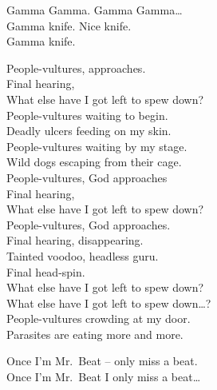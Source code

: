Gamma Gamma. Gamma Gamma… \\

Gamma knife. Nice knife. \\
Gamma knife. \\




People-vultures,  approaches. \\
Final hearing, \\
What else have I got left to spew down? \\

People-vultures waiting to begin. \\
Deadly ulcers feeding on my skin. \\

People-vultures waiting by my stage. \\
Wild dogs escaping from their cage. \\

People-vultures, God approaches \\
Final hearing, \\
What else have I got left to spew down? \\

People-vultures, God approaches. \\
Final hearing, disappearing. \\
Tainted voodoo, headless guru. \\
Final head-spin. \\
What else have I got left to spew down? \\

What else have I got left to spew down…? \\

People-vultures crowding at my door. \\
Parasites are eating more and more. \\




Once I'm Mr.~Beat -- only miss a beat. \\
Once I'm Mr.~Beat I only miss a beat… \\


